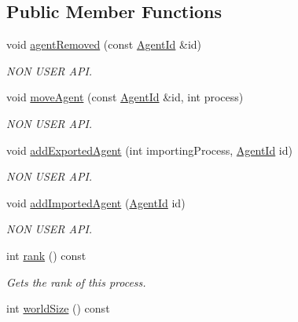 \subsection*{Public Member Functions}
\begin{DoxyCompactItemize}
\item 
void \hyperlink{classrepast_1_1_repast_process_a20f9086d8f764dea44ddefd157279263}{agent\-Removed} (const \hyperlink{classrepast_1_1_agent_id}{Agent\-Id} \&id)
\begin{DoxyCompactList}\small\item\em N\-O\-N U\-S\-E\-R A\-P\-I. \end{DoxyCompactList}\item 
void \hyperlink{classrepast_1_1_repast_process_a87cced37db3a1810fa4a4beed5c83998}{move\-Agent} (const \hyperlink{classrepast_1_1_agent_id}{Agent\-Id} \&id, int process)
\begin{DoxyCompactList}\small\item\em N\-O\-N U\-S\-E\-R A\-P\-I. \end{DoxyCompactList}\item 
void \hyperlink{classrepast_1_1_repast_process_ab155561fac49d5c7c21a14d385010321}{add\-Exported\-Agent} (int importing\-Process, \hyperlink{classrepast_1_1_agent_id}{Agent\-Id} id)
\begin{DoxyCompactList}\small\item\em N\-O\-N U\-S\-E\-R A\-P\-I. \end{DoxyCompactList}\item 
void \hyperlink{classrepast_1_1_repast_process_a69b8c957acb0d9df24ea37a7d3755e0e}{add\-Imported\-Agent} (\hyperlink{classrepast_1_1_agent_id}{Agent\-Id} id)
\begin{DoxyCompactList}\small\item\em N\-O\-N U\-S\-E\-R A\-P\-I. \end{DoxyCompactList}\item 
int \hyperlink{classrepast_1_1_repast_process_a13b9bbfd146fd534f71c9b7990bab347}{rank} () const 
\begin{DoxyCompactList}\small\item\em Gets the rank of this process. \end{DoxyCompactList}\item 
\hypertarget{classrepast_1_1_repast_process_a7c2aecbb70e0f589d8c458f64f481939}{int \hyperlink{classrepast_1_1_repast_process_a7c2aecbb70e0f589d8c458f64f481939}{world\-Size} () const }\label{classrepast_1_1_repast_process_a7c2aecbb70e0f589d8c458f64f481939}


\end{DoxyCompactItemize}
